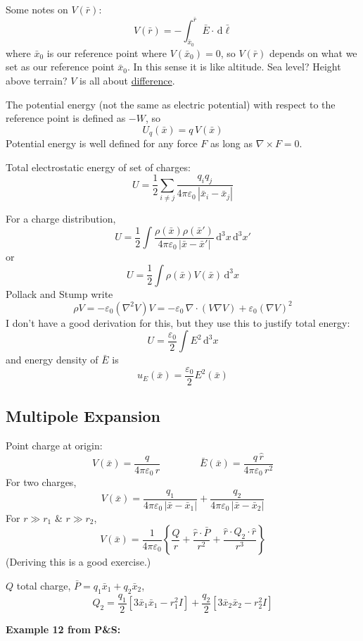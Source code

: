 \documentclass[11pt]{article}
\newcommand{\eps}{\varepsilon_0}
\newcommand{\dd}{\,\mathrm{d}}
\begin{document}
Some notes on $V(\bar{r})$:
\[
  V(\bar{r}) = -\int_{\bar{x}_0}^{\bar{r}}\bar{E}\cdot\dd\bar{\ell}
\]
where $\bar{x}_0$ is our reference point where $V(\bar{x}_0)=0$, so $V(\bar{r})$ depends on what we set as our reference point $\bar{x}_0$. In this sense it is like altitude. Sea level? Height above terrain? $V$ is all about \underline{difference}.

The potential energy (not the same as electric potential) with respect to the reference point is defined as $-W$, so
\[
  U_q(\bar{x}) = q\,V(\bar{x})
\]
Potential energy is well defined for any force $F$ as long as $\nabla\times F=0$.

Total electrostatic energy of set of charges:
\[
  U = \frac{1}{2}\sum_{i\neq j}\frac{q_iq_j}{4\pi\eps\,|\bar{x}_i-\bar{x}_j|}
\]

For a charge distribution,
\[
  U = \frac{1}{2}\int\frac{\rho(\bar{x})\rho(\bar{x}')}{4\pi\eps\,|\bar{x}-\bar{x}'|}\dd^3x\dd^3x'
\]
or
\[
  U = \frac{1}{2}\int\rho(\bar{x})V(\bar{x})\dd^3x
\]
Pollack and Stump write
\[
  \rho V = -\eps(\nabla^2V)V = -\eps\,\nabla\cdot(V\nabla V) + \eps(\nabla V)^2
\]
I don't have a good derivation for this, but they use this to justify total energy:
\[
  U = \frac{\eps}{2}\int E^2\dd^3x
\]
and energy density of $\bar{E}$ is
\[
  u_E(\bar{x}) = \frac{\eps}{2}E^2(\bar{x})
\]

\subsection{Multipole Expansion}

Point charge at origin:
\[
  V(\bar{x}) = \frac{q}{4\pi\eps\,r}
  \qquad\qquad
  \bar{E}(\bar{x}) = \frac{q\,\hat{r}}{4\pi\eps\,r^2}
\]
For two charges,
\[
  V(\bar{x}) = \frac{q_1}{4\pi\eps\,|\bar{x}-\bar{x}_1|} + \frac{q_2}{4\pi\eps\,|\bar{x}-\bar{x}_2|}
\]
For $r\gg r_1$ \& $r\gg r_2$,
\[
  V(\bar{x}) = \frac{1}{4\pi\eps}\left\{\frac{Q}{r} + \frac{\hat{r}\cdot\bar{P}}{r^2} + \frac{\hat{r}\cdot Q_2\cdot\hat{r}}{r^3}\right\}
\]
(Deriving this is a good exercise.)

$Q$ total charge, \quad $\bar{P} = q_1\bar{x}_1 + q_2\bar{x}_2$,
\[
  Q_2 = \frac{q_1}{2}\left[3\bar{x}_1\bar{x}_1 - r_1^2 I\right] + \frac{q_2}{2}\left[3\bar{x}_2\bar{x}_2 - r_2^2 I\right]
\]

\textbf{Example 12 from P\&S:}

\begin{center}
\end{center}
\end{document}

